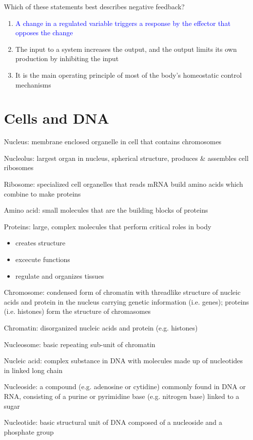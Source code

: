 \documentclass[11pt,fleqn]{book} %
\begin{document}
\begin{exercise}
    Which of these statements best describes negative feedback?
    \begin{enumerate}
        \item \textcolor{blue}{A change in a regulated variable triggers a response by the effector that opposes the change}
        \item The input to a system increases the output, and the output limits its own production by inhibiting the input
        \item It is the main operating principle of most of the body’s homeostatic control mechanisms
    \end{enumerate}
\end{exercise}

\section{Cells and DNA}
\begin{descriptions}
    \item[Nucleus:] membrane enclosed organelle in cell that contains chromosomes
    \item[Nucleolus:] largest organ in nucleus, spherical structure, produces \& assembles cell ribosomes
    \item[Ribosome:] specialized cell organelles that reads mRNA build amino acids which combine to make proteins
    \item[Amino acid:] small molecules that are the building blocks of proteins
    \item[Proteins:] large, complex molecules that perform critical roles in body
    \begin{itemize}
        \item creates structure
        \item excecute functions
        \item regulate and organizes tissues
    \end{itemize}
    \item[Chromosome:] condensed form of chromatin with threadlike structure of nucleic acids and protein in the nucleus carrying genetic information (i.e. genes); proteins (i.e. histones) form the structure of chromasomes
    \item[Chromatin:] disorganized nucleic acids and protein (e.g. histones)
    \item[Nucleosome:] basic repeating sub-unit of chromatin
    \item[Nucleic acid:] complex substance in DNA with molecules made up of nucleotides in linked long chain
    \item[Nucleoside:] a compound (e.g. adenosine or cytidine) commonly found in DNA or RNA, consisting of a purine or pyrimidine base (e.g. nitrogen base) linked to a sugar
    \item[Nucleotide:] basic structural unit of DNA composed of a nucleoside and a phosphate group
\end{descriptions}
\end{document}
